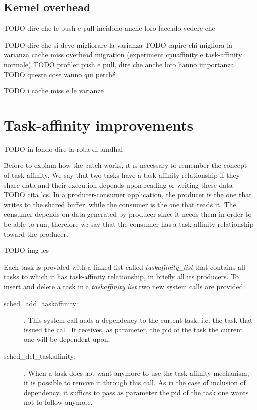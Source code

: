 \subsection{Kernel overhead}

TODO dire che le push e pull incidono anche loro facendo vedere che 

TODO dire che si deve migliorare la varianza
TODO capire chi migliora la varianza cache miss overhead migration (experiment cpuaffinity e task-affinity normale)
TODO profiler push e pull, dire che anche loro hanno importanza
TODO queste cose vanno qui perch\'e 


TODO i cache miss e le varianze

\section{Task-affinity improvements}

TODO in fondo dire la roba di amdhal

Before to explain how the patch works, it is necessary to remember the concept of task-affinity. We say that two tasks have a task-affinity relationship if 
they share data and their execution depends upon reading or writing these data TODO cita lcs. In a producer-consumer application, the producer 
is the one that writes to the shared buffer, while the consumer is the one that reads it. The consumer depends on data generated by producer since it needs 
them in order to be able to run, therefore we say that the consumer has a task-affinity relationship toward the producer.

TODO img lcs

Each task is provided with a linked list called \textit{taskaffinity\_list} that contains all tasks to which it has task-affinity relationship, in briefly 
all its producers. To insert and delete a task in a \textit{taskaffinity list} two new system calls are provided:

\begin{description}

\item[sched\_add\_taskaffinity:]. This system call adds a dependency to the current task, i.e. the task that issued the call. It receives, as parameter, the 
pid of the task the current one will be dependent upon.

\item[sched\_del\_taskaffinity:]. When a task does not want anymore to use the task-affinity mechanism, it is possible to remove it through this call.
As in the case of inclusion of dependency, it suffices to pass as parameter the pid of the task one wants not to follow anymore.

\end{description}

